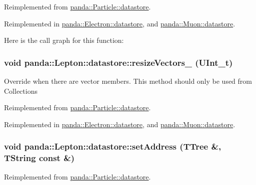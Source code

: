 Reimplemented from \hyperlink{structpanda_1_1Particle_1_1datastore_a9fa2653f0e8b59a5cbc752beaf6b7a57}{panda::Particle::datastore}.

Reimplemented in \hyperlink{structpanda_1_1Electron_1_1datastore_acd47db6bdd5b2308f4f1b02a9b1bd97f}{panda::Electron::datastore}, and \hyperlink{structpanda_1_1Muon_1_1datastore_ac48b5f3d5fb73f9e54f0f810d11f8010}{panda::Muon::datastore}.

Here is the call graph for this function:\hypertarget{structpanda_1_1Lepton_1_1datastore_ae0167ad568d7b57d6e11b1775cd790c7}{
\subsubsection[{resizeVectors\_\-}]{\setlength{\rightskip}{0pt plus 5cm}void panda::Lepton::datastore::resizeVectors\_\- (UInt\_\-t)}}
\label{structpanda_1_1Lepton_1_1datastore_ae0167ad568d7b57d6e11b1775cd790c7}


Override when there are vector members. This method should only be used from Collections 

Reimplemented from \hyperlink{structpanda_1_1Particle_1_1datastore_aef7e06dbd8399f7de3215aa895907c5f}{panda::Particle::datastore}.

Reimplemented in \hyperlink{structpanda_1_1Electron_1_1datastore_a8f0e7ee31635f5cf7482c86b732877a2}{panda::Electron::datastore}, and \hyperlink{structpanda_1_1Muon_1_1datastore_a77544efc70e6058bc86a09dc6a13f483}{panda::Muon::datastore}.\hypertarget{structpanda_1_1Lepton_1_1datastore_a01bc67f154130787caab05786b3169c6}{
\subsubsection[{setAddress}]{\setlength{\rightskip}{0pt plus 5cm}void panda::Lepton::datastore::setAddress (TTree \&, \/  TString const \&)}}
\label{structpanda_1_1Lepton_1_1datastore_a01bc67f154130787caab05786b3169c6}


Reimplemented from \hyperlink{structpanda_1_1Particle_1_1datastore_a3e4a1f8d223d8378ef2b92a6d4ccd2b0}{panda::Particle::datastore}.

